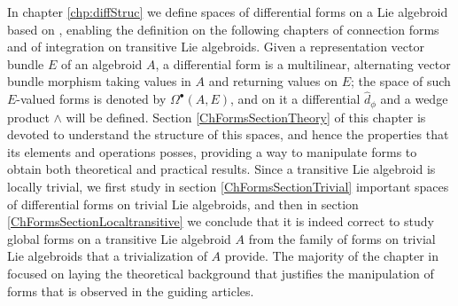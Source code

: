 In chapter \ref{chp:diffStruc} we define spaces of differential forms on a Lie algebroid based on \cite{Lazzarini2012}, enabling the definition on the following chapters of connection forms and of integration on transitive Lie algebroids. Given a representation vector bundle $E$ of an algebroid $A$, a differential form is a multilinear, alternating vector bundle morphism taking values in $A$ and returning values on $E$; the space of such $E$-valued forms is denoted by $\Omega^\bullet(A, E)$, and on it a differential $\hat d_\phi$ and a wedge product $\wedge$ will be defined. Section \ref{ChFormsSectionTheory} of this chapter is devoted to understand the structure of this spaces, and hence the properties that its elements and operations posses, providing a way to manipulate forms to obtain both theoretical and practical results. Since a transitive Lie algebroid is locally trivial, we first study in section \ref{ChFormsSectionTrivial} important spaces of differential forms on trivial Lie algebroids, and then in section \ref{ChFormsSectionLocaltransitive} we conclude that it is indeed correct to study global forms on a transitive Lie algebroid $A$ from the family of forms on trivial Lie algebroids that a trivialization of $A$ provide. The majority of the chapter in focused on laying the theoretical background that justifies the manipulation of forms that is observed in the guiding articles.


